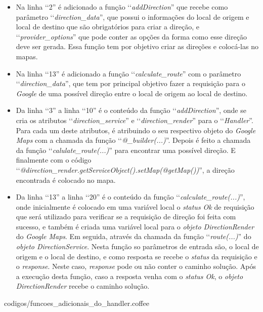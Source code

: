 \begin{itemize}

 \item Na linha ‘‘2'' é adicionado a função ‘‘\emph{addDirection}'' que recebe como parâmetro
 ‘‘\emph{direction\_data}'', que possui o informações do local de origem e local de destino que são
 obrigatórios para criar a direção, e ‘‘\emph{provider\_options}'' que pode conter as opções da forma
 como esse direção deve ser gerada. Essa função tem por objetivo criar as direções e colocá-las no mapas.

 \item Na linha ‘‘13'' é adicionado a função ‘‘\emph{calculate\_route}'' com o parâmetro
 ‘‘\emph{direction\_data}'', que tem por principal objetivo fazer a requisição para o \emph{Google } de uma
 possível direção entre o local de origem ao local de destino.

 \item Da linha ‘‘3'' a linha ‘‘10'' é o conteúdo da função ‘‘\emph{addDirection}'', onde se cria os
 atributos ‘‘\emph{direction\_service}'' e ‘‘\emph{direction\_render}'' para o ‘‘\emph{Handler}''. Para
 cada um deste atributos, é atribuindo o seu respectivo objeto do \emph{Google Maps} com a chamada da função
 ‘‘\emph{@\_builder(...)}''. Depois é feito a chamada da função ‘‘\emph{calulate\_route(...)}''
 para encontrar uma possível direção. E finalmente com o código
 ‘‘\emph{@direction\_render.getServiceObject().setMap(@getMap())}'', a direção encontrada é colocado
 no mapa.

 \item Da linha ‘‘13'' a linha ‘‘20'' é o conteúdo da função ‘‘\emph{calculate\_route(...)}'', onde
 inicialmente é colocado em uma variável local o \emph{status Ok} de requisição que será utilizado
 para verificar se a requisição de direção foi feita com sucesso, e também é criada uma variável local
 para o \emph{objeto DirectionRender} do \emph{Google Maps}. Em seguida, através da chamada da função
 ‘‘\emph{route(...)}'' do \emph{objeto DirectionService}. Nesta função so parâmetros de entrada são,
 o local de origem e o local de destino, e como resposta se recebe o \emph{status} da requisição
 e o \emph{response}. Neste caso, \emph{response} pode ou não conter o caminho solução. Após a execução
 desta função, caso a resposta venha com o \emph{status Ok}, o \emph{objeto DirectionRender} recebe o
 caminho solução.

\end{itemize}


{codigos/funcoes_adicionais_do_handler.coffee}
